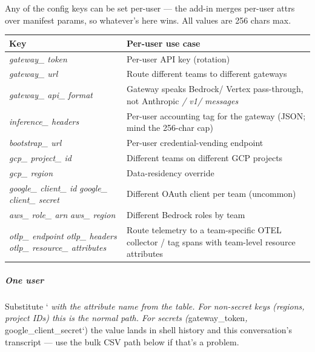 \documentclass[11pt]{article}
\begin{document}
Any of the config keys can be set per-user — the add-in merges per-user attrs over manifest params, so whatever's here wins. All values are 256 chars max.


\begingroup
\small
\setlength{\tabcolsep}{2pt}
\begin{longtable}{>{\RaggedRight\arraybackslash\hspace{0pt}}p{}>{\RaggedRight\arraybackslash\hspace{0pt}}p{}}
\toprule
{} \textbf{Key} & \textbf{Per-user use case} \\
\midrule
{} \emph{gateway\_\allowbreak{} token} & Per-user API key (rotation) \\
{} \emph{gateway\_\allowbreak{} url} & Route different teams to different gateways \\
{} \emph{gateway\_\allowbreak{} api\_\allowbreak{} format} & Gateway speaks Bedrock/ Vertex pass-through, not Anthropic \emph{/ v1/ messages} \\
{} \emph{inference\_\allowbreak{} headers} & Per-user accounting tag for the gateway (JSON; mind the 256-char cap) \\
{} \emph{bootstrap\_\allowbreak{} url} & Per-user credential-vending endpoint \\
{} \emph{gcp\_\allowbreak{} project\_\allowbreak{} id} & Different teams on different GCP projects \\
{} \emph{gcp\_\allowbreak{} region} & Data-residency override \\
{} \emph{google\_\allowbreak{} client\_\allowbreak{} id} \emph{google\_\allowbreak{} client\_\allowbreak{} secret} & Different OAuth client per team (uncommon) \\
{} \emph{aws\_\allowbreak{} role\_\allowbreak{} arn} \emph{aws\_\allowbreak{} region} & Different Bedrock roles by team \\
{} \emph{otlp\_\allowbreak{} endpoint} \emph{otlp\_\allowbreak{} headers} \emph{otlp\_\allowbreak{} resource\_\allowbreak{} attributes} & Route telemetry to a team-specific OTEL collector /  tag spans with team-level resource attributes \\
\bottomrule
\end{longtable}
\endgroup

\subparagraph{One user}\mbox{}\par

Substitute `\emph{ with the attribute name from the table. For non-secret keys (regions, project IDs) this is the normal path. For secrets (}gateway\_\allowbreak{}token\emph{, }google\_\allowbreak{}client\_\allowbreak{}secret`) the value lands in shell history and this conversation's transcript — use the bulk CSV path below if that's a problem.
\end{document}
